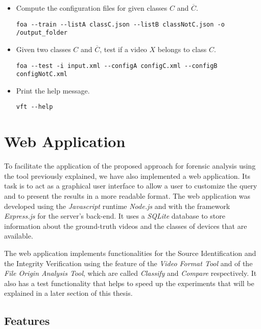 \begin{itemize}

\item Compute the configuration files for given classes $C$ and $\overline{C}$.
\begin{lstlisting}
foa --train --listA classC.json --listB classNotC.json -o /output_folder
\end{lstlisting}

\item Given two classes $C$ and $\overline{C}$, test if a video $X$ belongs to class $C$.
\begin{lstlisting}
foa --test -i input.xml --configA configC.xml --configB configNotC.xml
\end{lstlisting}

\item Print the help message.
\begin{lstlisting}
vft --help
\end{lstlisting}

\end{itemize}

\section{Web Application}

To facilitate the application of the proposed approach for forensic analysis using the tool previously explained, we have also implemented a web application. Its task is to act as a graphical user interface to allow a user to customize the query and to present the results in a more readable format. The web application was developed using the \emph{Javascript} runtime \emph{Node.js} \cite{node} and with the framework \emph{Express.js} \cite{express} for the server's back-end. It uses a \emph{SQLite} database to store information about the ground-truth videos and the classes of devices that are available.

The web application implements functionalities for the Source Identification and the Integrity Verification using the feature of the \emph{Video Format Tool} and of the \emph{File Origin Analysis Tool}, which are called \emph{Classify} and \emph{Compare} respectively.
It also has a test functionality that helps to speed up the experiments that will be explained in a later section of this thesis.

\subsection{Features}

